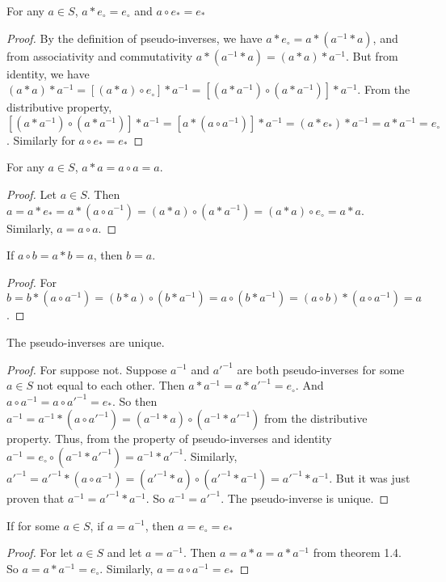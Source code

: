 \documentclass[crop=false,class=book]{standalone}
\begin{document}
\begin{theorem} For any $a\in S$, $a*e_{\circ}=e_{\circ}$ and $a\circ e_{*}=e_{*}$
\end{theorem}
\begin{proof} By the definition of pseudo-inverses, we have $a*e_{\circ}=a*(a^{-1}*a)$, and from associativity and commutativity $a*(a^{-1}*a)=(a*a)*a^{-1}$. But from identity, we have $(a*a)*a^{-1}=[(a*a)\circ e_{\circ}]*a^{-1}=[(a*a^{-1})\circ (a*a^{-1})]*a^{-1}$. From the distributive property, $[(a*a^{-1})\circ (a*a^{-1})]*a^{-1}=[a*(a\circ a^{-1})]*a^{-1}=(a*e_{*})*a^{-1}=a*a^{-1}=e_{\circ}$. Similarly for $a\circ e_{*}=e_{*}$
\end{proof}
\begin{theorem} For any $a\in S$, $a*a = a\circ a = a$.
\end{theorem}
\begin{proof} Let $a\in S$. Then $a=a*e_{*}=a*(a\circ a^{-1})=(a*a)\circ(a*a^{-1})=(a*a)\circ e_{\circ}=a*a$. Similarly, $a=a\circ a$.
\end{proof}
\begin{theorem} If $a\circ b = a*b = a$, then $b=a$. 
\end{theorem}
\begin{proof}
For $b = b*(a\circ a^{-1}) = (b*a)\circ(b* a^{-1})= a\circ (b* a^{-1}) = (a\circ b)*(a\circ a^{-1}) = a$.
\end{proof}
\begin{theorem} The pseudo-inverses are unique.
\end{theorem}
\begin{proof} For suppose not. Suppose $a^{-1}$ and $a'^{-1}$ are both pseudo-inverses for some $a\in S$ not equal to each other.  Then $a*a^{-1}=a* a'^{-1}=e_{\circ}$. And $a\circ a^{-1}=a\circ a'^{-1}=e_{*}$. So then $a^{-1}=a^{-1}*(a\circ a'^{-1})=(a^{-1}*a)\circ (a^{-1}*a'^{-1})$ from the distributive property. Thus, from the property of pseudo-inverses and identity $a^{-1}=e_{\circ}\circ (a^{-1}*a'^{-1})=a^{-1}*a'^{-1}$. Similarly, $a'^{-1}=a'^{-1}*(a\circ a^{-1})=(a'^{-1}*a)\circ (a'^{-1}*a^{-1})=a'^{-1}*a^{-1}$. But it was just proven that $a^{-1}=a'^{-1}*a^{-1}$. So $a^{-1}=a'^{-1}$. The pseudo-inverse is unique.
\end{proof}
\begin{theorem} If for some $a\in S$, if $a=a^{-1}$, then $a=e_{\circ}=e_{*}$
\end{theorem}
\begin{proof} For let $a\in S$ and let $a=a^{-1}$. Then $a=a*a=a*a^{-1}$ from theorem 1.4. So $a=a*a^{-1}=e_{\circ}$. Similarly, $a=a\circ a^{-1} = e_{*}$
\end{proof}
\end{document}

